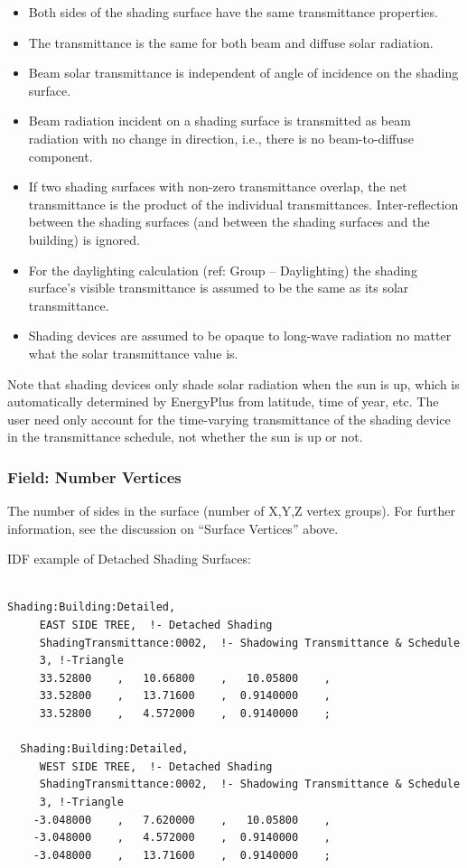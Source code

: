 \begin{itemize}
\item
  Both sides of the shading surface have the same transmittance properties.
\item
  The transmittance is the same for both beam and diffuse solar radiation.
\item
  Beam solar transmittance is independent of angle of incidence on the shading surface.
\item
  Beam radiation incident on a shading surface is transmitted as beam radiation with no change in direction, i.e., there is no beam-to-diffuse component.
\item
  If two shading surfaces with non-zero transmittance overlap, the net transmittance is the product of the individual transmittances. Inter-reflection between the shading surfaces (and between the shading surfaces and the building) is ignored.
\item
  For the daylighting calculation (ref: Group -- Daylighting) the shading surface's visible transmittance is assumed to be the same as its solar transmittance.
\item
  Shading devices are assumed to be opaque to long-wave radiation no matter what the solar transmittance value is.
\end{itemize}

Note that shading devices only shade solar radiation when the sun is up, which is automatically determined by EnergyPlus from latitude, time of year, etc. The user need only account for the time-varying transmittance of the shading device in the transmittance schedule, not whether the sun is up or not.

\subsubsection{Field: Number Vertices}\label{field-number-vertices}

The number of sides in the surface (number of X,Y,Z vertex groups). For further information, see the discussion on ``Surface Vertices'' above.

IDF example of Detached Shading Surfaces:

\begin{lstlisting}

Shading:Building:Detailed,
     EAST SIDE TREE,  !- Detached Shading
     ShadingTransmittance:0002,  !- Shadowing Transmittance & Schedule
     3, !-Triangle
     33.52800    ,   10.66800    ,   10.05800    ,
     33.52800    ,   13.71600    ,  0.9140000    ,
     33.52800    ,   4.572000    ,  0.9140000    ;

  Shading:Building:Detailed,
     WEST SIDE TREE,  !- Detached Shading
     ShadingTransmittance:0002,  !- Shadowing Transmittance & Schedule
     3, !-Triangle
    -3.048000    ,   7.620000    ,   10.05800    ,
    -3.048000    ,   4.572000    ,  0.9140000    ,
    -3.048000    ,   13.71600    ,  0.9140000    ;
\end{lstlisting}

